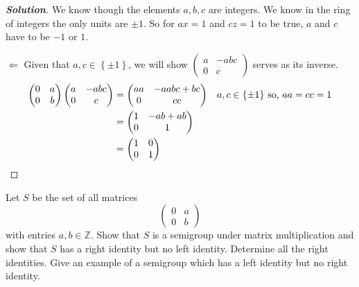 \documentclass[11pt]{article}
\newenvironment{problem}[2][Problem\!]{\begin{trivlist}
\item[\hskip \labelsep {\bfseries #1}\hskip \labelsep {\bfseries #2}]}{\end{trivlist}}
\newenvironment{solution}{\begin{proof}[\textbf{\textit{Solution}}] }{\end{proof}}
\newcommand{\zz}{\mathbb Z}   %
\newcommand{\set}[1]{\left\{#1\right\}} %
\newcommand\m[1]{\begin{pmatrix}#1\end{pmatrix}}
\begin{document}
\begin{solution}
        We know though the elements $a,b,c$ are integers. We know in the ring of integers the only units are $\pm 1$. So for $ax = 1$ and $cz = 1$ to be true, $a$ and $c$ have to be $-1$ or $1$.

        $\Leftarrow$ Given that $a,c \in \set{\pm 1}$, we will show $\m{a & -abc \\ 0 & c}$ serves as its inverse. 
        \begin{align*}
            \pmat \m{a & -abc \\ 0 & c} &= \m{aa & -aabc + bc \\ 0 & cc} && \text{$a,c \in \set{\pm 1}$ so, $aa= cc =1 $}\\
            &= \m{1 & -ab + ab \\ 0 & 1} \\
            &= \idm
        \end{align*} 
    \end{solution}
\newpage
\begin{tcolorbox}[, sharp corners = uphill]
    \begin{problem}{1.3}
        Let $S$ be the set of all matrices \[\m{0 & a \\ 0 & b}\] with entries $a,b\in \zz$. Show that $S$ is a semigroup under matrix multiplication and show that $S$ has a right identity but no left identity. Determine all the right identities. Give an example of a semigroup which has a left identity but no right identity. 
    \end{problem}
\end{tcolorbox}
\end{document}
